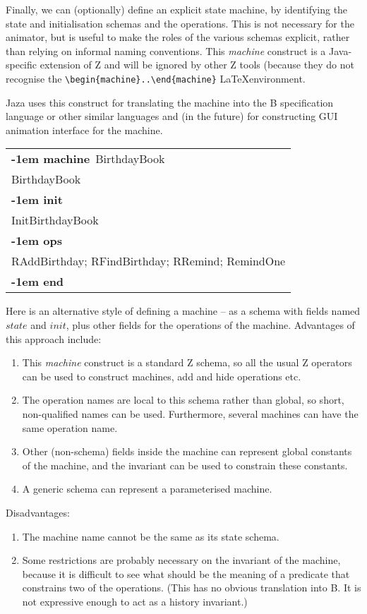 \documentclass{article}
\makeatletter
\newenvironment{machine}[1]{
    \begin{tabular}{@{\qquad}l}\textbf{\kern-1em machine}\ #1\\ }{
    \\ \textbf{\kern-1em end} \end{tabular} }
\newcommand{\machineInit}{\\ \textbf{\kern-1em init} \\}
\newcommand{\machineOps}{\\ \textbf{\kern-1em ops} \\}
\makeatother
\begin{document}
Finally, we can (optionally) define an explicit state machine,
by identifying the state and initialisation schemas and the
operations.  This is not necessary for the animator, but is
useful to make the roles of the various schemas explicit, rather
than relying on informal naming conventions.  
This \emph{machine} construct is a Java-specific extension of Z
and will be ignored by other Z tools (because they do not
recognise the \verb!\begin{machine}..\end{machine}! \LaTeX environment.

Jaza uses this construct for translating the machine into the B
specification language or other similar languages and (in the future) for
constructing GUI animation interface for the machine.


\begin{machine}{BirthdayBook}
  BirthdayBook
\machineInit
  InitBirthdayBook
\machineOps
    RAddBirthday; 
    RFindBirthday;
    RRemind;
    RemindOne
\end{machine}

  
Here is an alternative style of defining a machine -- as a
schema with fields named $state$ and $init$, plus other
fields for the operations of the machine.  
Advantages of this approach include:
\begin{enumerate}

\item This \emph{machine} construct is a standard Z schema, 
  so all the usual Z operators can be used to construct machines, 
  add and hide operations etc.  

\item The operation names are local to this schema rather than global, 
  so short, non-qualified names can be used.  Furthermore, several
  machines can have the same operation name.

\item Other (non-schema) fields inside the machine can represent
  global constants of the machine, and the invariant can be used
  to constrain these constants.

\item A generic schema can represent a parameterised machine.  
\end{enumerate}

Disadvantages: 
\begin{enumerate}
\item The machine name cannot be the same as its state schema.  
\item Some restrictions are probably necessary on the invariant
  of the machine, because it is difficult to see what should be
  the meaning of a predicate that constrains two of the operations.
  (This has no obvious translation into B.  It is not expressive
  enough to act as a history invariant.)
\end{enumerate}
\end{document}
